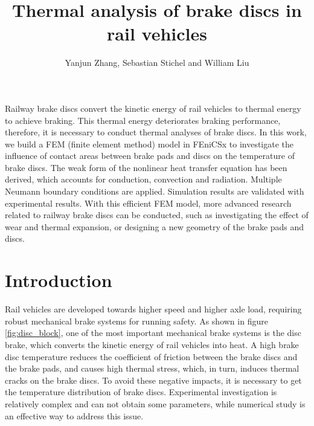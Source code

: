 \graphicspath{{chapters/zhang/graphics/}}


\title{Thermal analysis of brake discs in rail vehicles}

\author{Yanjun Zhang, Sebastian Stichel and William Liu}


\maketitle

\abstract{}
Railway brake discs convert the kinetic energy of rail vehicles to thermal energy to achieve braking. This thermal energy deteriorates braking performance, therefore, it is necessary to conduct thermal analyses of brake discs. In this work, we build a FEM (finite element method) model in FEniCSx to investigate the influence of contact areas between brake pads and discs on the temperature of brake discs. The weak form of the nonlinear heat transfer equation has been derived, which accounts for conduction, convection and radiation. Multiple Neumann boundary conditions are applied. Simulation results are validated with experimental results. With this efficient FEM model, more advanced research related to railway brake discs can be conducted, such as investigating the effect of wear and thermal expansion, or designing a new geometry of the brake pads and discs.

\section*{Introduction}
Rail vehicles are developed towards higher speed and higher axle load, requiring robust mechanical brake systems for running safety. As shown in figure \ref{fig:disc_block}, one of the most important mechanical brake systems is the disc brake, which converts the kinetic energy of rail vehicles into heat. A high brake disc temperature reduces the coefficient of friction between the brake discs and the brake pads\cite{Saffar2010}, and causes high thermal stress, which, in turn, induces thermal cracks on the brake discs. To avoid these negative impacts, it is necessary to get the temperature distribution of brake discs. Experimental investigation is relatively complex and can not obtain some parameters, while numerical study is an effective way to address this issue.

